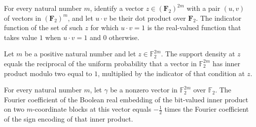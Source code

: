 \begin{theorem}
\label{FABL.setIndicator_innerProductModTwoOneSet}
\leanok
{}
For every natural number $m$, identify a vector $z\in(\mathbf F_2)^{2m}$ with a pair
$(u,v)$ of vectors in $(\mathbf F_2)^m$, and let $u\cdot v$ be their dot product over
$\mathbf F_2$. The indicator function of the set of such $z$ for which $u\cdot v=1$ is
the real-valued function that takes value $1$ when $u\cdot v=1$ and $0$ otherwise.
\end{theorem}

\begin{theorem}
\label{FABL.innerProductModTwoSupportDensity_apply}
\leanok
{}
Let $m$ be a positive natural number and let $z\in\mathbb{F}_2^{2m}$. The support
density at $z$ equals the reciprocal of the uniform probability that a vector in
$\mathbb{F}_2^{2m}$ has inner product modulo two equal to $1$, multiplied by the
indicator of that condition at $z$.
\end{theorem}

\begin{theorem}
\label{FABL.vectorFourierCoeff_booleanRealEmbedding_innerProductModTwoBit_of_ne_zero}
\leanok
{}
For every natural number $m$, let $\gamma$ be a nonzero vector in $\mathbb{F}_2^{2m}$ over $\mathbb{F}_2$.
The Fourier coefficient of the Boolean real embedding of the bit-valued inner product on
two $m$-coordinate blocks at this vector equals $-\frac12$ times the Fourier coefficient
of the sign encoding of that inner product.
\end{theorem}

